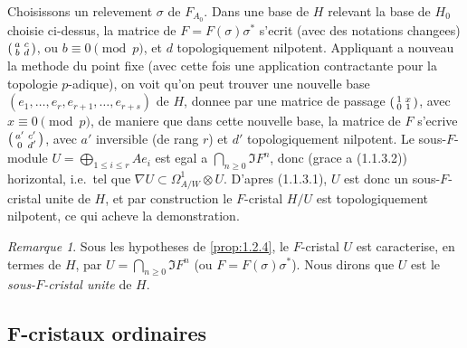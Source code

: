 \documentclass[12pt,a4paper]{article}
\theoremstyle{plain}
\theoremstyle{definition}
\theoremstyle{remark}
\newtheorem{remark}[theorem]{Remarque}
\begin{document}
Choisissons un relevement $\sigma$ de $F_{A_0}$. Dans une base de $H$ relevant la base de $H_0$ choisie ci-dessus, la matrice de $F = F(\sigma)\sigma^*$ s'ecrit (avec des notations changees) $\begin{psmallmatrix} a & c \\ b & d \end{psmallmatrix}$, ou $b \equiv 0 \pmod{p}$, et $d$ topologiquement nilpotent. Appliquant a nouveau la methode du point fixe (avec cette fois une application contractante pour la topologie $p$-adique), on voit qu'on peut trouver une nouvelle base $(e_1, \ldots, e_r, e_{r+1}, \ldots, e_{r+s})$ de $H$, donnee par une matrice de passage $\begin{psmallmatrix} 1 & x \\ 0 & 1 \end{psmallmatrix}$, avec $x \equiv 0 \pmod{p}$, de maniere que dans cette nouvelle base, la matrice de $F$ s'ecrive $\begin{psmallmatrix} a' & c' \\ 0 & d' \end{psmallmatrix}$, avec $a'$ inversible (de rang $r$) et $d'$ topologiquement nilpotent. Le sous-$F$-module $U = \bigoplus_{1 \leq i \leq r} Ae_i$ est egal a $\bigcap_{n \geq 0} \Im F^n$, donc (grace a (1.1.3.2)) horizontal, i.e.\ tel que $\nabla U \subset \Omega^1_{A/W} \otimes U$. D'apres (1.1.3.1), $U$ est donc un sous-$F$-cristal unite de $H$, et par construction le $F$-cristal $H/U$ est topologiquement nilpotent, ce qui acheve la demonstration.

\begin{remark}\label{rem:1.2.5}
Sous les hypotheses de \ref{prop:1.2.4}, le $F$-cristal $U$ est caracterise, en termes de $H$, par $U = \bigcap_{n \geq 0} \Im F^n$ (ou $F = F(\sigma)\sigma^*$). Nous dirons que $U$ est le \emph{sous-$F$-cristal unite} de $H$.
\end{remark}

\subsection{F-cristaux ordinaires}

\subsubsection{}
\end{document}
